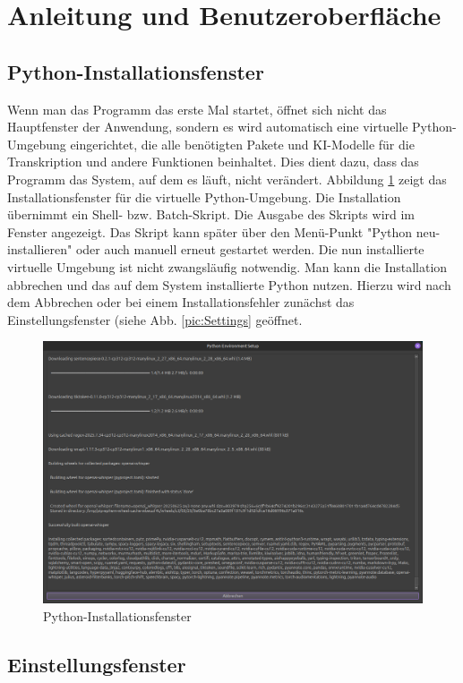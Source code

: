 \section{Anleitung und Benutzeroberfläche}
\label{sec:gui}

\subsection{Python-Installationsfenster}
\label{sub:install}

Wenn man das Programm das erste Mal startet, öffnet sich nicht das Hauptfenster der Anwendung, sondern es wird automatisch eine virtuelle Python-Umgebung eingerichtet, die alle benötigten Pakete und \ac{KI}-Modelle für die Transkription und andere Funktionen beinhaltet. Dies dient dazu, dass das Programm das System, auf dem es läuft, nicht verändert. Abbildung \ref{pic:Install} zeigt das Installationsfenster für die virtuelle Python-Umgebung. Die Installation übernimmt ein Shell- bzw. Batch-Skript. Die Ausgabe des Skripts wird im Fenster angezeigt. Das Skript kann später über den Menü-Punkt "Python neu-installieren" oder auch manuell erneut gestartet werden. Die nun installierte virtuelle Umgebung ist nicht zwangsläufig notwendig. Man kann die Installation abbrechen und das auf dem System installierte Python nutzen. Hierzu wird nach dem Abbrechen oder bei einem Installationsfehler zunächst das Einstellungsfenster (siehe Abb. \ref{pic:Settings} geöffnet.

\begin{figure}
    \centering
    \includegraphics[width=0.7\linewidth]{Bilder/Python-Installationsfenster}
    \caption[Python-Installationsfenster]{Python-Installationsfenster}
    \label{pic:Install}
\end{figure}


\subsection{Einstellungsfenster}

